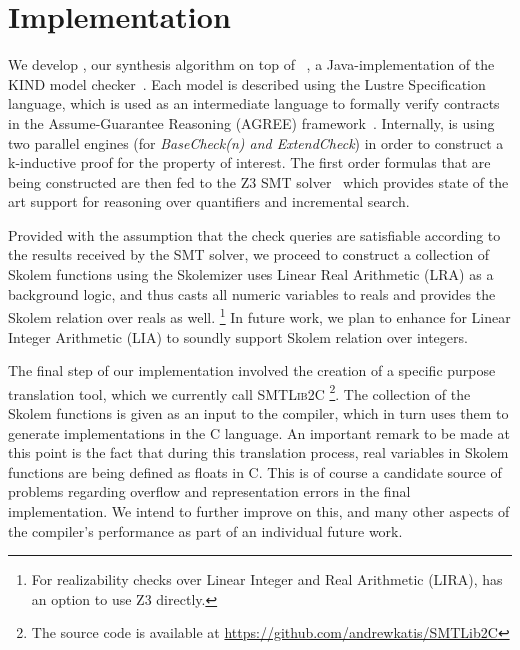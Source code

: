 \section{Implementation}
\label{sec:impl}

We develop \jkindsynt, our synthesis algorithm on top of \jkind~\cite{jkind},
a Java-implementation of the \textsc{KIND} model
checker~\cite{Hagen08:kind}. Each model is described using the Lustre
Specification language, which is used as an intermediate language to formally verify contracts in the
Assume-Guarantee Reasoning (\textsc{AGREE}) framework~\cite{NFM2012:CoGaMiWhLaLu}.
Internally, \jkind is using two parallel engines (for \textit{BaseCheck(n) and
\textit{ExtendCheck}}) in order to construct a k-inductive proof for the
property of interest.
The first order formulas that are being constructed are then fed to the \textsc{Z3} SMT
solver~\cite{DeMoura08:z3} which provides state of the art support for reasoning
over quantifiers and incremental search.

Provided with the assumption that the check queries are satisfiable according to
the results received by the SMT solver, we proceed to construct a collection of
Skolem functions using the \aeval Skolemizer%
\aeval  uses Linear Real Arithmetic (LRA) as a background logic, and thus casts all numeric variables to reals and provides the Skolem relation over reals as well.%
\footnote{For realizability checks over Linear Integer and Real
  Arithmetic (LIRA), \jkind has an option to use \textsc{Z3} directly.}
In future work, we plan to enhance  \aeval for Linear Integer Arithmetic (LIA) to soundly support Skolem relation over integers.

The final step of our implementation involved the creation of a specific purpose
translation tool, which we currently call \textsc{SMTLib2C}%
\footnote{The source code
is available at \url{https://github.com/andrewkatis/SMTLib2C}}. The collection
of the Skolem functions is given as an input to the compiler, which in turn uses
them to generate implementations in the C language. An important remark to be
made at this point is the fact that during this translation process, real
variables in Skolem functions are being defined as floats in C. This is of
course a candidate source of problems regarding overflow and representation
errors in the final implementation. We intend to further improve on this, and
many other aspects of the compiler's performance as part of an individual
future work.



